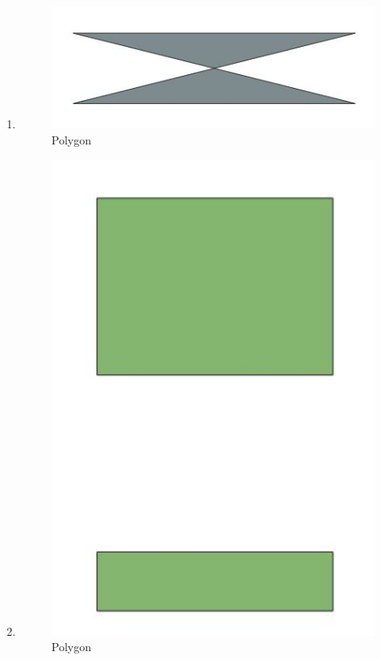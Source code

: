 \begin{enumerate}
	\item 
	
	\begin{figure}[H]
		\includegraphics[width=12cm]{figures/1174034/No8.JPG}
		\centering
		\caption{Polygon}
	\end{figure}
	
	\item 
	
	\begin{figure}[H]
		\includegraphics[width=12cm]{figures/1174034/No9.JPG}
		\centering
		\caption{Polygon}
	\end{figure}
	

\end{enumerate}
